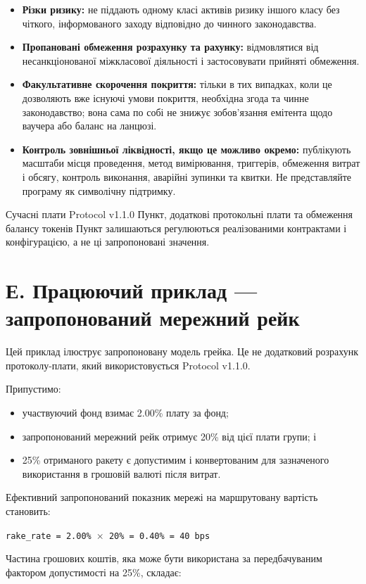 \documentclass[11pt]{article}
\begin{document}
\begin{itemize}[leftmargin=*]
\item \textbf{Різки ризику:} не піддають одному класі активів ризику іншого класу без чіткого, інформованого заходу відповідно до чинного законодавства.
\item \textbf{Пропановані обмеження розрахунку та рахунку:} відмовлятися від несанкціонованої міжкласової діяльності і застосовувати прийняті обмеження.
\item \textbf{Факультативне скорочення покриття:} тільки в тих випадках, коли це дозволяють вже існуючі умови покриття, необхідна згода та чинне законодавство; вона сама по собі не знижує зобов'язання емітента щодо ваучера або баланс на ланцюзі.
\item \textbf{Контроль зовнішньої ліквідності, якщо це можливо окремо:} публікують масштаби місця проведення, метод вимірювання, триггерів, обмеження витрат і обсягу, контроль виконання, аварійні зупинки та квитки. Не представляйте програму як символічну підтримку.
\end{itemize}
Сучасні плати Protocol v1.1.0 Пункт, додаткові протокольні плати та обмеження балансу токенів Пункт залишаються регулюються реалізованими контрактами і конфігурацією, а не ці запропоновані значення.


\section*{Е. Працюючий приклад --- запропонований мережний рейк}

Цей приклад ілюструє запропоновану модель грейка. Це не додатковий розрахунк протоколу-плати, який використовується Protocol v1.1.0.

Припустимо:

\begin{itemize}[leftmargin=*]
\item участвуючий фонд взимає 2.00\% плату за фонд;
\item запропонований мережний рейк отримує 20\% від цієї плати групи; і
\item 25\% отриманого ракету є допустимим і конвертованим для зазначеного використання в грошовій валюті після витрат.
\end{itemize}
Ефективний запропонований показник мережі на маршрутовану вартість становить:

\texttt{rake\_rate = 2.00\% $\times$ 20\% = 0.40\% = 40 bps}

Частина грошових коштів, яка може бути використана за передбачуваним фактором допустимості на 25\%, складає:
\end{document}
